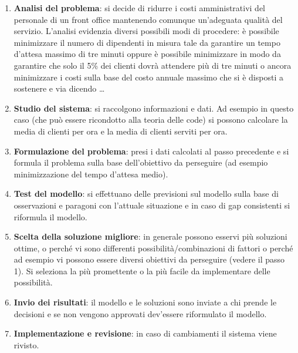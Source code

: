\documentclass[11pt]{book}
\begin{document}
\begin{enumerate}
  
\item {\bf Analisi del problema}: si decide di ridurre i costi
  amministrativi del personale di un front office mantenendo comunque
  un'adeguata qualit\`a del servizio. L'analisi evidenzia diversi
  possibili modi di procedere: \`e possibile minimizzare il numero di
  dipendenti in misura tale da garantire un tempo d'attesa massimo di
  tre minuti oppure \`e possibile minimizzare in modo da garantire che
  solo il 5\% dei clienti dovr\`a attendere pi\`u di tre minuti o
  ancora minimizzare i costi sulla base del costo annuale massimo che
  si \`e disposti a sostenere e via dicendo \dots

\item {\bf Studio del sistema}: si raccolgono informazioni e dati. Ad
  esempio in questo caso (che pu\`o essere ricondotto alla teoria
  delle code) si possono calcolare la media di clienti per ora e la
  media di clienti serviti per ora.

\item {\bf Formulazione del problema}: presi i dati calcolati al passo
  precedente e si formula il problema sulla base dell'obiettivo da
  perseguire (ad esempio minimizzazione del tempo d'attesa medio).

\item {\bf Test del modello}: si effettuano delle previsioni sul
  modello sulla base di osservazioni e paragoni con l'attuale
  situazione e in caso di gap consistenti si riformula il modello.

\item {\bf Scelta della soluzione migliore}: in generale possono
  esservi pi\`u soluzioni ottime, o perch\'e vi sono differenti
  possibilit\`a/combinazioni di fattori o perch\'e ad esempio vi
  possono essere diversi obiettivi da perseguire (vedere il passo
  1). Si seleziona la pi\`u promettente o la pi\`u facile da
  implementare delle possibilit\`a.

\item {\bf Invio dei risultati}: il modello e le soluzioni sono
  inviate a chi prende le decisioni e se non vengono approvati
  dev'essere riformulato il modello.

\item {\bf Implementazione e revisione}: in caso di cambiamenti il
  sistema viene rivisto.

\end{enumerate}
\end{document}
